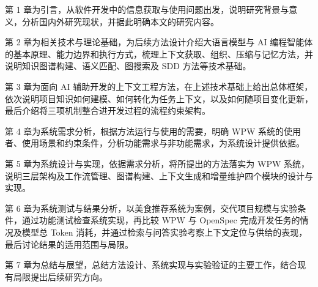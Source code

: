 第 1 章为引言，从软件开发中的信息获取与使用问题出发，说明研究背景与意义，分析国内外研究现状，并据此明确本文的研究内容。

第 2 章为相关技术与理论基础，为后续方法设计介绍大语言模型与 AI 编程智能体的基本原理、能力边界和执行方式，梳理上下文获取、组织、压缩与记忆方法，并说明知识图谱构建、语义匹配、图搜索及 SDD 方法等技术基础。

第 3 章为面向 AI 辅助开发的上下文工程方法，在上述技术基础上给出总体框架，依次说明项目知识如何建模、如何转化为任务上下文，以及如何随项目变化更新，最后介绍将三项机制整合进开发过程的流程约束架构。

第 4 章为系统需求分析，根据方法运行与使用的需要，明确 WPW 系统的使用者、使用场景和约束条件，分析功能需求与非功能需求，为系统设计提供依据。

第 5 章为系统设计与实现，依据需求分析，将所提出的方法落实为 WPW 系统，说明三层架构及工作流管理、图谱构建、上下文生成和增量维护四个模块的设计与实现。

第 6 章为系统测试与结果分析，以美食推荐系统为案例，交代项目规模与实验条件，通过功能测试检查系统实现，再比较 WPW 与 OpenSpec 完成开发任务的情况及模型总 Token 消耗，并通过检索与问答实验考察上下文定位与供给的表现，最后讨论结果的适用范围与局限。

第 7 章为总结与展望，总结方法设计、系统实现与实验验证的主要工作，结合现有局限提出后续研究方向。
